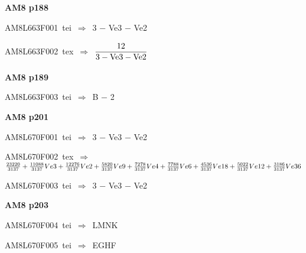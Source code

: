 \par\vfill\eject
{\bf\hfill AM8 p188\hfill\hbox{}}\par\bigskip
{\sixrm AM8L663F001\ {\sixit tei}\ }$\Rightarrow$\ 3 − Ve3 − Ve2\par\smallskip
{\sixrm AM8L663F002\ {\sixit tex}\ }$\Rightarrow$\ ${\displaystyle\strut 12\over \displaystyle\strut {3 - {\rm Ve}3 - {\rm Ve}2}}$\par\smallskip

\par\vfill\eject
{\bf\hfill AM8 p189\hfill\hbox{}}\par\bigskip
{\sixrm AM8L663F003\ {\sixit tei}\ }$\Rightarrow$\ {\tenit B} − 2\par\smallskip

\par\vfill\eject
{\bf\hfill AM8 p201\hfill\hbox{}}\par\bigskip
{\sixrm AM8L670F001\ {\sixit tei}\ }$\Rightarrow$\ 3 − {\tenit Ve}3 − {\tenit Ve}2\par\smallskip
{\sixrm AM8L670F002\ {\sixit tex}\ }$\Rightarrow$\ ${23220\over 3137} + {{11088\over 3137}}Ve3 + {{12276\over 3137}}Ve2 + {{5820\over 3137}}Ve9 + {{7278\over 3137}}  Ve4 + {{7788\over 3137}}Ve6 + {{4536\over 3137}}Ve18 + {{5022\over 3137}}Ve12 + {{3186\over 3137}}Ve36$\par\smallskip
{\sixrm AM8L670F003\ {\sixit tei}\ }$\Rightarrow$\ 3 − {\tenit Ve}3 − {\tenit Ve}2\par\smallskip

\par\vfill\eject
{\bf\hfill AM8 p203\hfill\hbox{}}\par\bigskip
{\sixrm AM8L670F004\ {\sixit tei}\ }$\Rightarrow$\ LMNK\par\smallskip
{\sixrm AM8L670F005\ {\sixit tei}\ }$\Rightarrow$\ EGHF\par\smallskip

